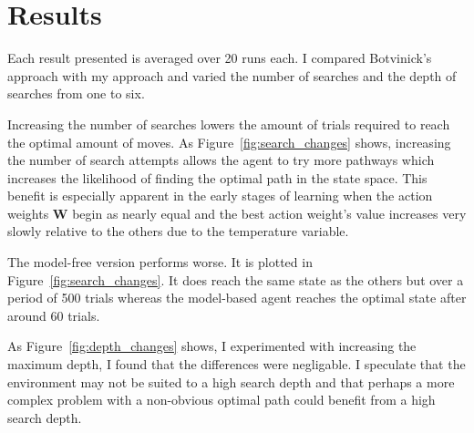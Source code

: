 \section{Results}
Each result presented is averaged over 20 runs each. I compared Botvinick's approach with my approach and varied the number of searches and the depth of searches from one to six.

Increasing the number of searches lowers the amount of trials required to reach the optimal amount of moves. As Figure~\ref{fig:search_changes} shows, increasing the number of search attempts allows the agent to try more pathways which increases the likelihood of finding the optimal path in the state space. This benefit is especially apparent in the early stages of learning when the action weights \textbf{W} begin as nearly equal and the best action weight's value increases very slowly relative to the others due to the temperature variable.

The model-free version performs worse. It is plotted in Figure~\ref{fig:search_changes}. It does reach the same state as the others but over a period of 500 trials whereas the model-based agent reaches the optimal state after around 60 trials.

As Figure~\ref{fig:depth_changes} shows, I experimented with increasing the maximum depth, I found that the differences were negligable. I speculate that the environment may not be suited to a high search depth and that perhaps a more complex problem with a non-obvious optimal path could benefit from a high search depth.





